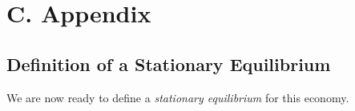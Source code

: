 

\clearpage
\section{C. {\sectionfour} Appendix\label{app:model}}
\renewcommand*{\thepage}{\Alph{section}\arabic{page}}
\setcounter{page}{1}


\subsection{Definition of a Stationary Equilibrium}\label{app:def_stat_equ}

We are now ready to define a \emph{stationary equilibrium} for this economy.

